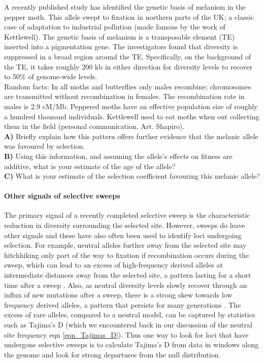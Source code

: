 \begin{question}
A recently published study has identified the genetic basis of
melanism in the pepper moth. This allele swept to fixation in northern
parts of the UK; a classic case of adaptation to industrial pollution
(made famous by the work of Kettlewell). The genetic basis of melanism
is a transposable element (TE) inserted into a pigmentation gene. The
investigators found that diversity is suppressed in a broad region
around the TE. Specifically, on the background of the TE, it takes
roughly 200 kb in either direction for diversity levels to recover to
50\% of genome-wide levels. \\

Random facts: In all moths and butterflies only males recombine;
chromosomes are transmitted without recombination in females. The
recombination rate in males is 2.9 cM/Mb.  Peppered moths have an
effective population size of roughly a hundred thousand
individuals. Kettlewell used to eat moths when out collecting them in
the field (personal communication, Art. Shapiro). \\
{\bf A)} Briefly explain how this pattern offers further evidence that the melanic allele was favoured by selection.\\
{\bf B)} Using this information, and assuming the allele's effects on fitness are additive, what is your estimate of the age of the allele? \\
{\bf C)} What is your estimate of the selection coefficient favouring this melanic allele?
\end{question}


\paragraph{Other signals of selective sweeps}
The primary signal of a recently completed selective sweep is the
characteristic reduction in diversity surrounding the selected site.
However, sweeps do leave other signals and these have also often been
used to identify loci undergoing selection. 
For example, neutral alleles further away from the selected site may
hitchhiking only part of the way to fixation if recombination occurs during
the sweep, which can lead to an excess of high-frequency
derived alleles at intermediate distances away from the selected site,
a pattern lasting for a short time after a sweep \citep{Fay:00,Przeworski:02,Kim:06}.
Also, as neutral diversity levels slowly recover through an influx of
new mutations after a sweep, there is a strong skew towards low
frequency derived alleles, a pattern that persists for many
generations \citep{Braverman:95, Przeworski:02,Kim:06}. The excess of
rare alleles, compared to a neutral model, can be captured by statistics such as Tajima's D (which
we encountered back in our discussion of the neutral site frequency eqn
\ref{eqn_Tajimas_D}). Thus one way to look for loci that have undergone selective sweeps is to calculate Tajima's D from data in
windows along the genome and look for
strong departures from the null distribution.

